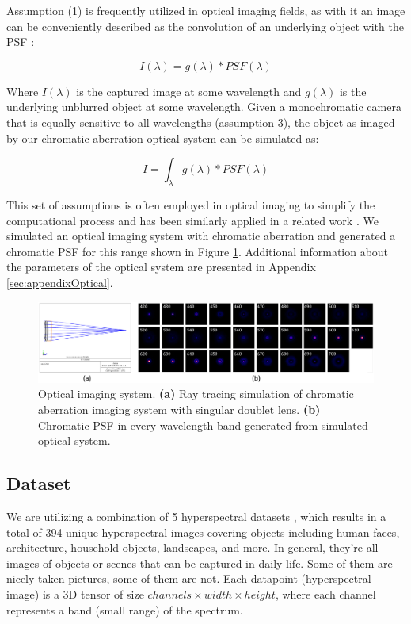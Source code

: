 \documentclass{article}
\begin{document}
Assumption (1) is frequently utilized in optical imaging fields, as with it an image can be conveniently described as the convolution of an underlying object with the PSF \cite{goodman2005introduction}:

\begin{equation}
    I(\lambda) = g(\lambda) \ast PSF(\lambda)
\end{equation}

Where $I(\lambda)$ is the captured image at some wavelength and $g(\lambda)$ is the underlying unblurred object at some wavelength. Given a monochromatic camera that is equally sensitive to all wavelengths (assumption 3), the object as imaged by our chromatic aberration optical system can be simulated as:

\begin{equation}
    I = \int_\lambda g(\lambda) \ast PSF(\lambda)
\end{equation}

This set of assumptions is often employed in optical imaging to simplify the computational process and has been similarly applied in a related work \cite{jeon2019compact}. We simulated an optical imaging system with chromatic aberration and generated a chromatic PSF for this range shown in Figure \ref{fig:opticalsystem}. Additional information about the parameters of the optical system are presented in Appendix \ref{sec:appendixOptical}.

\begin{figure}
    \centering
    \includegraphics[width=\textwidth]{figs/opticalsystem.png}
    \caption{Optical imaging system. \textbf{(a)} Ray tracing simulation of chromatic aberration imaging system with singular doublet lens. \textbf{(b)} Chromatic PSF in every wavelength band generated from simulated optical system.}
    \label{fig:opticalsystem}
\end{figure}

\subsection{Dataset}
We are utilizing a combination of 5 hyperspectral datasets \cite{CAVE_0293,chakrabarti2011statistics,arad_and_ben_shahar_2016_ECCV,DeepCASSI:SIGA:2017,farrell2003simulation}, which results in a total of 394 unique hyperspectral images covering objects including human faces, architecture, household objects, landscapes, and more. In general, they're all images of objects or scenes that can be captured in daily life. Some of them are nicely taken pictures, some of them are not. Each datapoint (hyperspectral image) is a 3D tensor of size $channels \times width \times height$, where each channel represents a band (small range) of the spectrum.
\end{document}
